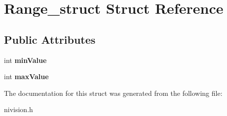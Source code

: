\hypertarget{structRange__struct}{\section{\-Range\-\_\-struct \-Struct \-Reference}
\label{structRange__struct}
}
\subsection*{\-Public \-Attributes}
\begin{DoxyCompactItemize}
\item 
\hypertarget{structRange__struct_aa5bfa23bf8eefefd22a42624f39ddc25}{int {\bfseries min\-Value}}\label{structRange__struct_aa5bfa23bf8eefefd22a42624f39ddc25}

\item 
\hypertarget{structRange__struct_aede24e3f197648e2cc93ef619eb2ad93}{int {\bfseries max\-Value}}\label{structRange__struct_aede24e3f197648e2cc93ef619eb2ad93}

\end{DoxyCompactItemize}


\-The documentation for this struct was generated from the following file\-:\begin{DoxyCompactItemize}
\item 
nivision.\-h\end{DoxyCompactItemize}
